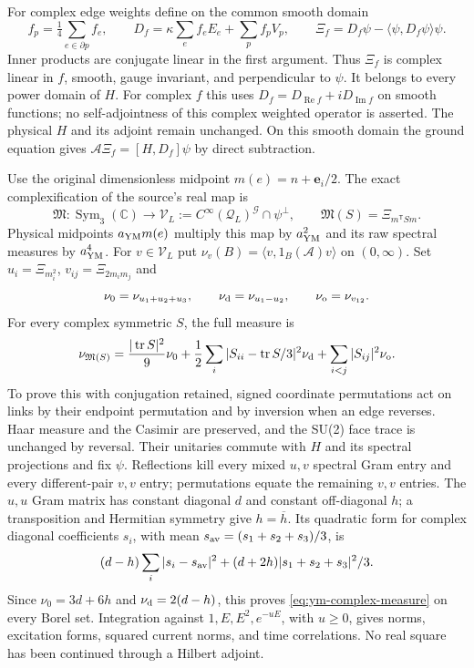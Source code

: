 For complex edge weights define on the common smooth domain
\[
 f_p=\tfrac14\sum_{e\in\partial p}f_e,\qquad
 D_f=\kappa\sum_ef_eE_e+\sum_pf_pV_p,\qquad
 \Xi_f=D_f\psi-\langle\psi,D_f\psi\rangle\psi .
\]
Inner products are conjugate linear in the first argument.
Thus $\Xi_f$ is complex linear in $f$, smooth, gauge invariant,
and perpendicular to $\psi$. It belongs to every power domain of
$H$. For complex $f$ this uses
$D_f=D_{\operatorname{Re}f}+iD_{\operatorname{Im}f}$ on smooth
functions; no self-adjointness of this complex weighted operator
is asserted. The physical $H$ and its adjoint remain unchanged.
On this smooth domain the ground equation gives
$\mathcal A\Xi_f=[H,D_f]\psi$ by direct subtraction.

Use the original dimensionless midpoint $m(e)=n+\mathbf e_i/2$.
The exact complexification of the source's real map is
\[
 \mathfrak M:\operatorname{Sym}_3(\mathbb C)\longrightarrow
 \mathscr V_L:=C^\infty(\mathcal Q_L)^{\mathcal G}\cap\psi^\perp,
 \qquad \mathfrak M(S)=\Xi_{m^{\mathsf T}Sm}.
\]
Physical midpoints $a_{\rm YM}m(e)$ multiply this map by
$a_{\rm YM}^2$ and its raw spectral measures by $a_{\rm YM}^4$.
For $v\in\mathscr V_L$ put
$\nu_v(B)=\langle v,1_B(\mathcal A)v\rangle$ on $(0,\infty)$.
Set $u_i=\Xi_{m_i^2}$, $v_{ij}=\Xi_{2m_im_j}$ and
\[
 \nu_0=\nu_{u_1+u_2+u_3},\qquad
 \nu_{\rm d}=\nu_{u_1-u_2},\qquad \nu_{\rm o}=\nu_{v_{12}}.
\]
For every complex symmetric $S$, the full measure is
\begin{equation}\label{eq:ym-complex-measure}
 \nu_{\mathfrak M(S)}
 =\frac{|\operatorname{tr}S|^2}{9}\nu_0
 +\frac12\sum_i|S_{ii}-\operatorname{tr}S/3|^2\nu_{\rm d}
 +\sum_{i<j}|S_{ij}|^2\nu_{\rm o}.
\end{equation}
To prove this with conjugation retained, signed coordinate
permutations act on links by their endpoint permutation and by
inversion when an edge reverses. Haar measure and the Casimir are
preserved, and the SU(2) face trace is unchanged by reversal.
Their unitaries commute with $H$ and its spectral projections and
fix $\psi$. Reflections kill every mixed $u,v$ spectral Gram entry
and every different-pair $v,v$ entry; permutations equate the
remaining $v,v$ entries. The $u,u$ Gram matrix has constant
diagonal $d$ and constant off-diagonal $h$; a transposition and
Hermitian symmetry give $h=\overline h$. Its quadratic form for
complex diagonal coefficients $s_i$, with mean
$s_{\rm av}=(s_1+s_2+s_3)/3$, is
\[
 (d-h)\sum_i|s_i-s_{\rm av}|^2
 +(d+2h)|s_1+s_2+s_3|^2/3 .
\]
Since $\nu_0=3d+6h$ and $\nu_{\rm d}=2(d-h)$, this proves
\eqref{eq:ym-complex-measure} on every Borel set. Integration
against $1,E,E^2,e^{-uE}$, with $u\ge0$, gives norms, excitation forms, squared
current norms, and time correlations. No real square has been
continued through a Hilbert adjoint.

